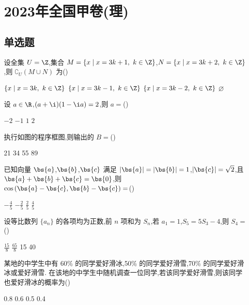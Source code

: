 \chapter{2023年全国甲卷(理)}

\section{单选题}

\begin{problem}
设全集 \( U=\Z \),集合 \( M=\{x\mid x=3k+1,\ k\in \Z\} \),\( N=\{x\mid x=3k+2,\ k\in \Z\} \),则 \( \complement_U\left( M\cup N \right) \) 为(\quad)

\choices
    {\(\{x\mid x=3k,\ k\in \Z\}\)}
    {\(\{x\mid x=3k-1,\ k\in \Z\}\)}
    {\(\{x\mid x=3k-2,\ k\in \Z\}\)}
    {\(\varnothing\)}
\end{problem}

\begin{problem}
设 \( a\in \R \),\( (a+\i)(1-\i a)=2 \),则 \( a= \)(\quad)

\choices
    {\(-2\)}
    {\(-1\)}
    {\(1\)}
    {\(2\)}
\end{problem}

\begin{problem}
执行如图的程序框图,则输出的 \( B= \)(\quad)


\choices
    {21}
    {34}
    {55}
    {89}
\end{problem}

\begin{problem}
已知向量 \(\bs{a}\),\(\bs{b}\),\(\bs{c}\) 满足 \( \lvert \bs{a} \rvert=\lvert \bs{b} \rvert=1 \),\( \lvert \bs{c} \rvert=\sqrt{2} \),且 \( \bs{a}+\bs{b}+\bs{c}=\bs{0} \),则 \( \cos\left( \bs{a}-\bs{c},\bs{b}-\bs{c} \right)= \)(\quad)

\choices
    {\(-\frac45\)}
    {\(-\frac25\)}
    {\(\frac25\)}
    {\(\frac45\)}
\end{problem}

\begin{problem}
设等比数列 \( \{a_n\} \) 的各项均为正数,前 \( n \) 项和为 \( S_n \),若 \( a_1=1 \),\( S_5=5S_3-4 \),则 \( S_4= \)(\quad)

\choices
    {\(\frac{15}{8}\)}
    {\(\frac{65}{8}\)}
    {15}
    {40}
\end{problem}

\begin{problem}
某地的中学生中有 60\% 的同学爱好滑冰,50\% 的同学爱好滑雪,70\% 的同学爱好滑冰或爱好滑雪. 在该地的中学生中随机调查一位同学,若该同学爱好滑雪,则该同学也爱好滑冰的概率为(\quad)

\choices
    {0.8}
    {0.6}
    {0.5}
    {0.4}
\end{problem}

